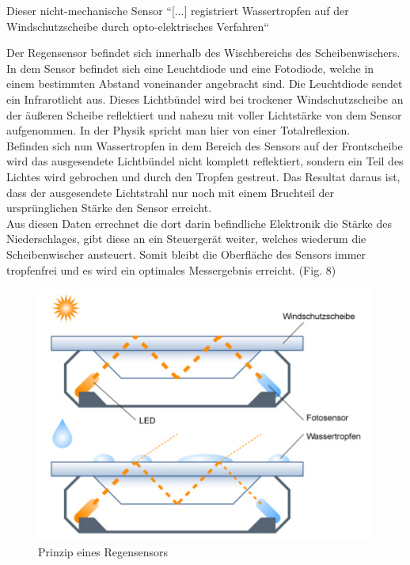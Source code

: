 \begin{flushleft}
	                Dieser nicht-mechanische Sensor ``[...] registriert Wassertropfen auf der Windschutzscheibe durch opto-elektrisches Verfahren`` \cite{TS_regen}
	                
	                Der Regensensor befindet sich innerhalb des Wischbereichs des Scheibenwischers.                
					In dem Sensor befindet sich eine Leuchtdiode und eine Fotodiode, welche in einem bestimmten Abstand voneinander angebracht sind. Die Leuchtdiode sendet ein Infrarotlicht aus. Dieses Lichtbündel wird bei trockener Windschutzscheibe an der äußeren Scheibe reflektiert und nahezu mit voller Lichtstärke von dem Sensor aufgenommen. In der Physik spricht man hier von einer Totalreflexion.\\
					Befinden sich nun Wassertropfen in dem Bereich des Sensors auf der Frontscheibe wird das ausgesendete Lichtbündel nicht komplett reflektiert, sondern ein Teil des Lichtes wird gebrochen und durch den Tropfen gestreut. Das Resultat daraus ist, dass der ausgesendete Lichtstrahl nur noch mit einem Bruchteil der ursprünglichen Stärke den Sensor erreicht.\\
					Aus diesen Daten errechnet die dort darin befindliche Elektronik die Stärke des Niederschlages, gibt diese an ein Steuergerät weiter, welches wiederum die Scheibenwischer ansteuert. Somit bleibt die Oberfläche des Sensors immer tropfenfrei und es wird ein optimales Messergebnis erreicht. (Fig. 8)
					
					\begin{figure}[h]
						\centering
						\includegraphics{regensensor2.jpg}
	                    \caption[archiv.langzeittest.de/volvo-s40/intern/grafik/cb-regensensor-prinzip.jpg] {Prinzip eines Regensensors}
	                    \label{fig:TS06}
	                \end{figure}
	                

\end{flushleft}
